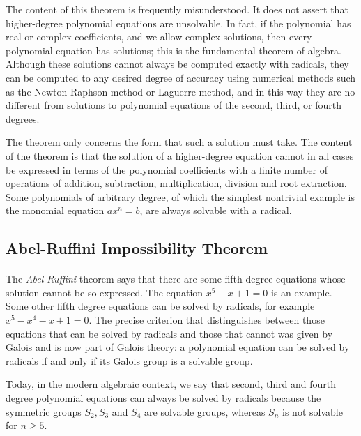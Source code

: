 The content of this theorem is frequently misunderstood. It does not assert that higher-degree polynomial equations are unsolvable. 
In fact, if the polynomial has real or complex coefficients, and we allow complex solutions, then every polynomial equation has solutions; this is the fundamental theorem of algebra. Although these solutions cannot always be computed exactly with radicals, they can be computed to any desired degree of accuracy using numerical methods such as the Newton-Raphson method or Laguerre method, and in this way they are no different from solutions to polynomial equations of the second, third, or fourth degrees.

The theorem only concerns the form that such a solution must take. The content of the theorem is 
that the solution of a higher-degree equation cannot in all cases be expressed in terms of the polynomial coefficients with a finite number of operations of addition, subtraction, multiplication, division and root extraction. Some polynomials of arbitrary degree, of which the simplest nontrivial example is the monomial equation $ax^n = b$, are always solvable with a radical.



\subsection*{Abel-Ruffini Impossibility Theorem}

\paragraph{}

The \emph{Abel-Ruffini} theorem says that there are some fifth-degree equations whose solution cannot be so expressed. 
The equation $x^5 - x + 1 = 0$ is an example. Some other fifth degree equations can be solved by radicals, 
for example $x^5 - x^4 - x + 1 = 0$. The precise criterion that distinguishes between those equations that can be solved 
by radicals and those that cannot was given by Galois and is now part of Galois theory: 
a polynomial equation can be solved by radicals if and only if its Galois group is a solvable group.

Today, in the modern algebraic context, we say that second, third and fourth degree polynomial 
equations can always be solved by radicals because the symmetric groups $S_2, S_3$ and $S_4$ are solvable groups, 
whereas $S_n$ is not solvable for $n \ge 5$.



